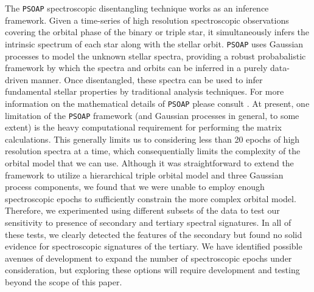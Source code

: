 \documentclass[twocolumn]{aastex61}
\begin{document}
The \texttt{PSOAP} spectroscopic disentangling technique works as an inference framework. Given a time-series of high resolution spectroscopic observations covering the orbital phase of the binary or triple star, it simultaneously infers the intrinsic spectrum of each star along with the stellar orbit. \texttt{PSOAP} uses Gaussian processes to model the unknown stellar spectra, providing a robust probabalistic framework by which the spectra and orbits can be inferred in a purely data-driven manner. Once disentangled, these spectra can be used to infer fundamental stellar properties by traditional analysis techniques. For more information on the mathematical details of \texttt{PSOAP} please consult \citet{czekala17}. At present, one limitation of the \texttt{PSOAP} framework (and Gaussian processes in general, to some extent) is the heavy computational requirement for performing the matrix calculations. This generally limits us to considering less than 20 epochs of high resolution spectra at a time, which consequentially limits the complexity of the orbital model that we can use. Although it was straightforward to extend the framework to utilize a hierarchical triple orbital model and three Gaussian process components, we found that we were unable to employ enough spectroscopic epochs to sufficiently constrain the more complex orbital model. Therefore, we experimented using different subsets of the data to test our sensitivity to presence of secondary and tertiary spectral signatures. In all of these tests, we clearly detected the features of the secondary but found no solid evidence for spectroscopic signatures of the tertiary. We have identified possible avenues of development to expand the number of spectroscopic epochs under consideration, but exploring these options will require development and testing beyond the scope of this paper.
\end{document}
